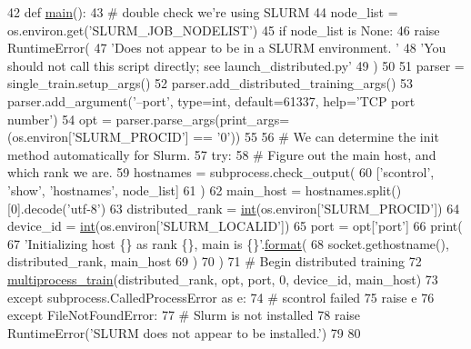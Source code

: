 \begin{DoxyCode}
42 \textcolor{keyword}{def }\hyperlink{namespaceparlai_1_1scripts_1_1distributed__train_a8fb5ab65a3210ae3a91ec244aeaf49f7}{main}():
43     \textcolor{comment}{# double check we're using SLURM}
44     node\_list = os.environ.get(\textcolor{stringliteral}{'SLURM\_JOB\_NODELIST'})
45     \textcolor{keywordflow}{if} node\_list \textcolor{keywordflow}{is} \textcolor{keywordtype}{None}:
46         \textcolor{keywordflow}{raise} RuntimeError(
47             \textcolor{stringliteral}{'Does not appear to be in a SLURM environment. '}
48             \textcolor{stringliteral}{'You should not call this script directly; see launch\_distributed.py'}
49         )
50 
51     parser = single\_train.setup\_args()
52     parser.add\_distributed\_training\_args()
53     parser.add\_argument(\textcolor{stringliteral}{'--port'}, type=int, default=61337, help=\textcolor{stringliteral}{'TCP port number'})
54     opt = parser.parse\_args(print\_args=(os.environ[\textcolor{stringliteral}{'SLURM\_PROCID'}] == \textcolor{stringliteral}{'0'}))
55 
56     \textcolor{comment}{# We can determine the init method automatically for Slurm.}
57     \textcolor{keywordflow}{try}:
58         \textcolor{comment}{# Figure out the main host, and which rank we are.}
59         hostnames = subprocess.check\_output(
60             [\textcolor{stringliteral}{'scontrol'}, \textcolor{stringliteral}{'show'}, \textcolor{stringliteral}{'hostnames'}, node\_list]
61         )
62         main\_host = hostnames.split()[0].decode(\textcolor{stringliteral}{'utf-8'})
63         distributed\_rank = \hyperlink{namespacelanguage__model_1_1eval__ppl_a7d12ee00479673c5c8d1f6d01faa272a}{int}(os.environ[\textcolor{stringliteral}{'SLURM\_PROCID'}])
64         device\_id = \hyperlink{namespacelanguage__model_1_1eval__ppl_a7d12ee00479673c5c8d1f6d01faa272a}{int}(os.environ[\textcolor{stringliteral}{'SLURM\_LOCALID'}])
65         port = opt[\textcolor{stringliteral}{'port'}]
66         print(
67             \textcolor{stringliteral}{'Initializing host \{\} as rank \{\}, main is \{\}'}.\hyperlink{namespaceparlai_1_1chat__service_1_1services_1_1messenger_1_1shared__utils_a32e2e2022b824fbaf80c747160b52a76}{format}(
68                 socket.gethostname(), distributed\_rank, main\_host
69             )
70         )
71         \textcolor{comment}{# Begin distributed training}
72         \hyperlink{namespaceparlai_1_1scripts_1_1multiprocessing__train_aa979267c9eb44bbdfcd25a6d69a58cc4}{multiprocess\_train}(distributed\_rank, opt, port, 0, device\_id, main\_host)
73     \textcolor{keywordflow}{except} subprocess.CalledProcessError \textcolor{keyword}{as} e:
74         \textcolor{comment}{# scontrol failed}
75         \textcolor{keywordflow}{raise} e
76     \textcolor{keywordflow}{except} FileNotFoundError:
77         \textcolor{comment}{# Slurm is not installed}
78         \textcolor{keywordflow}{raise} RuntimeError(\textcolor{stringliteral}{'SLURM does not appear to be installed.'})
79 
80 
\end{DoxyCode}
